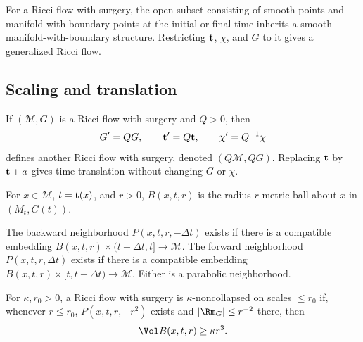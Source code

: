 \begin{proposition}
\label{prop:interior-generalized-ricci-flow}
For a Ricci flow with surgery, the open subset consisting of smooth points and
manifold-with-boundary points at the initial or final time inherits a smooth
manifold-with-boundary structure. Restricting ${\bf t}$, $\chi$, and $G$ to it
gives a generalized Ricci flow.
\end{proposition}

\subsection{Scaling and translation}

If $({\mathcal M},G)$ is a Ricci flow with surgery and $Q>0$, then
\[
  G'=QG,\qquad {\bf t}'=Q{\bf t},\qquad \chi'=Q^{-1}\chi
\]
defines another Ricci flow with surgery, denoted $(Q{\mathcal M},QG)$. Replacing
${\bf t}$ by ${\bf t}+a$ gives time translation without changing $G$ or $\chi$.

\begin{definition}
\label{def:metric-ball-spacetime}
For $x\in{\mathcal M}$, $t={\bf t}(x)$, and $r>0$,
$B(x,t,r)$ is the radius-$r$ metric ball about $x$ in $(M_t,G(t))$.
\end{definition}

\begin{definition}
\label{def:parabolic-neighborhood-surgery}
The backward neighborhood $P(x,t,r,-\Delta t)$ exists if there is a compatible
embedding $B(x,t,r)\times(t-\Delta t,t]\to{\mathcal M}$. The forward
neighborhood $P(x,t,r,\Delta t)$ exists if there is a compatible embedding
$B(x,t,r)\times[t,t+\Delta t)\to{\mathcal M}$. Either is a parabolic
neighborhood.
\end{definition}

\begin{definition}
\label{def:kappa-noncollapsed-surgery}
\label{defnkappa}
For $\kappa,r_0>0$, a Ricci flow with surgery is
$\kappa$-noncollapsed on scales $\leq r_0$ if, whenever $r\leq r_0$,
$P(x,t,r,-r^2)$ exists and $|\Rm_G|\leq r^{-2}$ there, then
\[
  \Vol B(x,t,r)\geq\kappa r^3.
\]
\end{definition}

